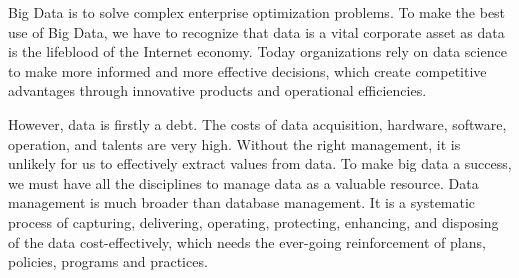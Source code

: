\documentclass[12pt]{book}
\begin{document}
Big Data is to solve complex enterprise optimization problems. To make the best use of Big Data, we have to recognize that data is a vital corporate asset as data is the lifeblood of the Internet economy. Today organizations rely on data science to make more informed and more effective decisions, which create competitive advantages through innovative products and operational efficiencies.

However, data is firstly a debt. The costs of data acquisition, hardware, software, operation, and talents are very high. Without the right management, it is unlikely for us to effectively extract values from data. To make big data a success, we must have all the disciplines to manage data as a valuable resource. Data management is much broader than database management. It is a systematic process of capturing, delivering, operating, protecting, enhancing, and disposing of the data cost-effectively, which needs the ever-going reinforcement of plans, policies, programs and practices. 
\end{document}
